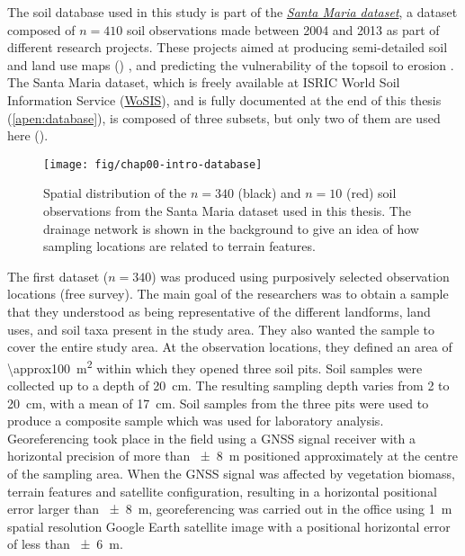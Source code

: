 The soil database used in this study is part of the \hyperref[apen:database]{\textit{Santa Maria 
dataset}}, a dataset composed of $n = 410$ soil observations made between \num{2004} and \num{2013} 
as part of different research projects. These projects aimed at producing semi-detailed soil and 
land use maps () \citep{Pedron2005, Miguel2010, SamuelRosaEtAl2011a, MiguelEtAl2012, 
Samuel-RosaEtAl2013}, and predicting the vulnerability of the topsoil to erosion 
\citep{MouraBueno2012, Miguel2013}. The Santa Maria dataset, which is freely available at ISRIC 
World Soil Information Service (\href{http://www.isric.org/data/wosis}{WoSIS}), and is fully 
documented at the end of this thesis (\autoref{apen:database}), is composed of three subsets, but 
only two of them are used here ().

\begin{figure}[!ht]
\centering
\texttt{[image: fig/chap00-intro-database]}
\caption{Spatial distribution of the $n = 340$ (black) and $n = 10$ (red) soil observations from 
the Santa Maria dataset used in this thesis. The drainage network is shown in the background to 
give an idea of how sampling locations are related to terrain features.}
\label{fig:intro-database}
\end{figure}

The first dataset ($n = 340$) was produced using purposively selected observation locations (free 
survey). The main goal of the researchers was to obtain a sample that they understood as being 
representative of the different landforms, land uses, and soil taxa present in the study area. They 
also wanted the sample to cover the entire study area. At the observation locations, they defined 
an area of \SI{\approx100}{\metre\squared} within which they opened three soil pits. Soil samples 
were collected up to a depth of \SI{20}{\centi\metre}. The resulting sampling depth varies from 
\num{2} to \SI{20}{\centi\metre}, with a mean of \SI{17}{\centi\metre}. Soil samples from the three 
pits were used to produce a composite sample which was used for laboratory analysis. Georeferencing 
took place in the field using a GNSS signal receiver with a horizontal precision of more than 
\SI{\pm8}{\metre} positioned approximately at the centre of the sampling area. When the GNSS signal 
was affected by vegetation biomass, terrain features and satellite configuration, resulting in a 
horizontal positional error larger than \SI{\pm8}{\metre}, georeferencing was carried out in the 
office using \SI{1}{\metre} spatial resolution Google Earth\textregistered{} satellite image with 
a positional horizontal error of less than \SI{\pm6}{\metre}.

